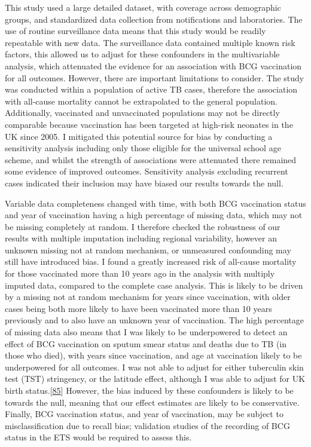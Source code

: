 \documentclass[11pt,twoside]{bristolthesis}
\begin{document}
  This study used a large detailed dataset, with coverage across demographic groups, and standardized data collection from notifications and laboratories. The use of routine surveillance data means that this study would be readily repeatable with new data. The surveillance data contained multiple known risk factors, this allowed us to adjust for these confounders in the multivariable analysis, which attenuated the evidence for an association with BCG vaccination for all outcomes. However, there are important limitations to consider. The study was conducted within a population of active TB cases, therefore the association with all-cause mortality cannot be extrapolated to the general population. Additionally, vaccinated and unvaccinated populations may not be directly comparable because vaccination has been targeted at high-risk neonates in the UK since 2005. I mitigated this potential source for bias by conducting a sensitivity analysis including only those eligible for the universal school age scheme, and whilst the strength of associations were attenuated there remained some evidence of improved outcomes. Sensitivity analysis excluding recurrent cases indicated their inclusion may have biased our results towards the null.
  
  Variable data completeness changed with time, with both BCG vaccination status and year of vaccination having a high percentage of missing data, which may not be missing completely at random. I therefore checked the robustness of our results with multiple imputation including regional variability, however an unknown missing not at random mechanism, or unmeasured confounding may still have introduced bias. I found a greatly increased risk of all-cause mortality for those vaccinated more than 10 years ago in the analysis with multiply imputed data, compared to the complete case analysis. This is likely to be driven by a missing not at random mechanism for years since vaccination, with older cases being both more likely to have been vaccinated more than 10 years previously and to also have an unknown year of vaccination. The high percentage of missing data also means that I was likely to be underpowered to detect an effect of BCG vaccination on sputum smear status and deaths due to TB (in those who died), with years since vaccination, and age at vaccination likely to be underpowered for all outcomes. I was not able to adjust for either tuberculin skin test (TST) stringency, or the latitude effect, although I was able to adjust for UK birth status.{[}\protect\hyperlink{ref-Roy2014b}{85}{]} However, the bias induced by these confounders is likely to be towards the null, meaning that our effect estimates are likely to be conservative. Finally, BCG vaccination status, and year of vaccination, may be subject to misclassification due to recall bias; validation studies of the recording of BCG status in the ETS would be required to assess this.
  
\end{document}
